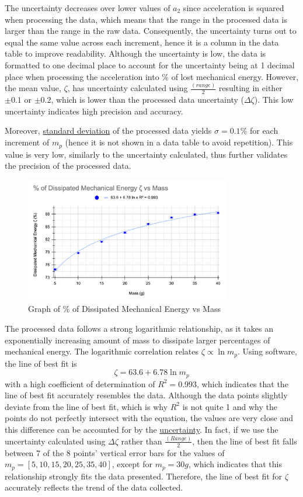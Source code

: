\documentclass[11pt]{article}
\begin{document}
The uncertainty decreases over lower values of $a_2$ since acceleration is squared when processing the data, which means that the range in the processed data is larger than the range in the raw data. Consequently, the uncertainty turns out to equal the same value across each increment, hence it is a column in the data table to improve readability. Although the uncertainty is low, the data is formatted to one decimal place to account for the uncertainty being at 1 decimal place when processing the acceleration into \% of lost mechanical energy. However, the mean value, $\zeta$, has uncertainty calculated using $\frac{(range)}{2}$ resulting in either $\pm0.1$ or $\pm0.2$, which is lower than the processed data uncertainty ($\Delta \zeta$). This low uncertainty indicates high precision and accuracy. 

Moreover, \underline{standard deviation} of the processed data yields $\sigma =0.1\%$ for each increment of $m_p$ (hence it is not shown in a data table to avoid repetition). This value is very low, similarly to the uncertainty calculated, thus further validates the precision of the processed data. 

\newpage

\begin{figure}[h]
    \centering
    \includegraphics[width=0.8\textwidth]{img/graph1.png}
    \caption{Graph of \% of Dissipated Mechanical Energy vs Mass}
    \label{fig:6}
\end{figure}

The processed data follows a strong logarithmic relationship, as it takes an exponentially increasing amount of mass to dissipate larger percentages of mechanical energy. The logarithmic correlation relates $\zeta \propto \ln{m_p}$. Using software, the line of best fit is $$\zeta = 63.6 + 6.78\ln m_p$$ with a high coefficient of determination of $R^2 = 0.993$, which indicates that the line of best fit accurately resembles the data. Although the data points slightly deviate from the line of best fit, which is why $R^2$ is not quite 1 and why the points do not perfectly intersect with the equation, the values are very close and this difference can be accounted for by the \underline{uncertainty}. In fact, if we use the uncertainty calculated using $\Delta \zeta$ rather than $\frac{(Range)}{2}$, then the line of best fit falls between 7 of the 8 points' vertical error bars for the values of $m_p=[5,10,15,20,25,35,40]$, except for $m_p = 30g$, which indicates that this relationship strongly fits the data presented. Therefore, the line of best fit for $\zeta$ accurately reflects the trend of the data collected. 
\end{document}
